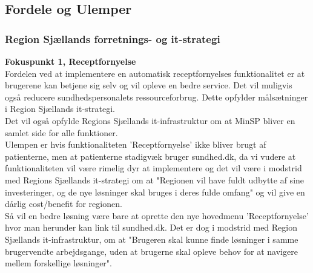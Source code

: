 %
%
%
\subsection{Fordele og Ulemper}
\subsubsection{Region Sjællands forretnings- og it-strategi}
\textbf{Fokuspunkt 1, Receptfornyelse}\\
Fordelen ved at implementere en automatisk receptfornyelses funktionalitet er at brugerene kan betjene sig selv og vil opleve en bedre service. Det vil muligvis også reducere sundhedspersonalets ressourceforbrug. Dette opfylder målsætninger i Region Sjællands it-strategi.\\
Det vil også opfylde Regions Sjællands it-infrastruktur om at MinSP bliver en samlet side for alle funktioner.\\
Ulempen er hvis funktionaliteten 'Receptfornyelse' ikke bliver brugt af patienterne, men at patienterne stadigvæk bruger sundhed.dk, da vi vudere at funktionaliteten vil være rimelig dyr at implementere og det vil være i modstrid med Regions Sjællands it-strategi om at "Regionen vil have fuldt udbytte af sine investeringer, og de nye løsninger skal bruges i deres fulde omfang" og vil give en dårlig cost/benefit for regionen. \\ 
Så vil en bedre løsning være bare at oprette den nye hovedmenu  'Receptfornyelse' hvor man herunder kan link til sundhed.dk. Det er dog i modstrid med Region Sjællands it-infrastruktur, om at "Brugeren skal kunne finde løsninger i samme brugervendte arbejdsgange, uden at brugerne skal opleve behov for at navigere mellem forskellige løsninger". 
\\\\
